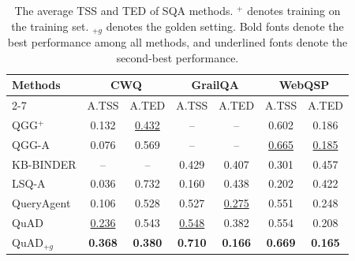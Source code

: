 \documentclass[runningheads]{llncs}
\begin{document}
\begin{table}[t]
\centering
\caption{The average TSS and TED of SQA methods.  $^+$ denotes training on the training set. $_{+g}$ denotes the golden setting. Bold fonts denote the best performance among all methods, and underlined fonts denote the second-best performance.}
\setlength{\tabcolsep}{8pt}
\begin{tabular}[t]{lcc|cc|cc}
     \toprule
    \multirow{2}{*}{\textbf{Methods}}  & \multicolumn{2}{c|}{\textbf{CWQ}}  &   
    \multicolumn{2}{c|}{\textbf{GrailQA}}&   
    \multicolumn{2}{c}{\textbf{WebQSP}}  \\    
   \cmidrule{2-7} 
     & A.TSS  & A.TED  & A.TSS  & A.TED & A.TSS &A.TED  \\
    \midrule
    QGG$^+$ & 0.132 & \underline{0.432} & -- & -- & 0.602 & 0.186 \\
    QGG-A &  0.076 & 0.569  & -- & -- & \underline{0.665} & \underline{0.185}  \\
    KB-BINDER & -- & -- & 0.429  & 0.407 & 0.301 & 0.457\\
    LSQ-A & 0.036 & 0.732 & 0.160 & 0.438 & 0.202  & 0.422  \\
    QueryAgent & 0.106 & 0.528 & 0.527 & \underline{0.275} & 0.551 & 0.248 \\
    \midrule
    QuAD & \underline{0.236} & 0.543 &  \underline{0.548} & 0.382 & 0.554 & 0.208 \\
    QuAD$_{+g}$ & \textbf{0.368} & \textbf{0.380} & \textbf{0.710} & \textbf{0.166} & \textbf{0.669} & \textbf{0.165} \\    %
    \bottomrule    
\end{tabular}
\vspace{-1em}
\label{table:sparql_query_construction2} 
\end{table}
\end{document}
